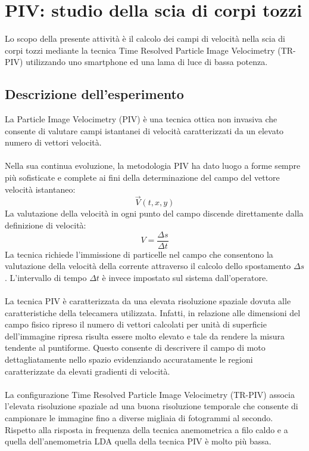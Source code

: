 \section{PIV: studio della scia di corpi tozzi}
Lo scopo della presente attività è il calcolo dei campi di velocità nella scia di corpi tozzi mediante la tecnica Time Resolved Particle Image Velocimetry (TR-PIV) utilizzando uno smartphone ed una lama di luce di bassa potenza.

\subsection{Descrizione dell'esperimento}
La Particle Image Velocimetry (PIV) è una tecnica ottica non invasiva che consente di valutare campi istantanei di velocità caratterizzati da un elevato numero di vettori velocità.\\\\
Nella sua continua evoluzione, la metodologia PIV ha dato luogo a forme sempre più sofisticate e complete ai fini della determinazione del campo del vettore velocità istantaneo:
\begin{equation*}
    \vec V (t, x, y)
\end{equation*}
La valutazione della velocità in ogni punto del campo discende direttamente dalla definizione di velocità:
\begin{equation*}
    V = \frac{\Delta s}{\Delta t}
\end{equation*}
La tecnica richiede l'immissione di particelle nel campo che consentono la valutazione della velocità della corrente attraverso il calcolo dello spostamento $\Delta s$. L'intervallo di tempo $\Delta t$ è invece impostato sul sistema dall'operatore.\\\\
La tecnica PIV è caratterizzata da una elevata risoluzione spaziale dovuta alle caratteristiche della telecamera utilizzata. Infatti, in relazione alle dimensioni del campo fisico ripreso il numero di vettori calcolati per unità di superficie dell'immagine ripresa risulta essere molto elevato e tale da rendere la misura tendente al puntiforme. Questo consente di descrivere il campo di moto dettagliatamente nello spazio evidenziando accuratamente le regioni caratterizzate da elevati gradienti di velocità.\\\\
La configurazione Time Resolved Particle Image Velocimetry (TR-PIV) associa l'elevata risoluzione spaziale ad una buona risoluzione temporale che consente di campionare le immagine fino a diverse migliaia di fotogrammi al secondo. Rispetto alla risposta in frequenza della tecnica anemometrica a filo caldo e a quella dell'anemometria LDA quella della tecnica PIV è molto più bassa.\\\\
